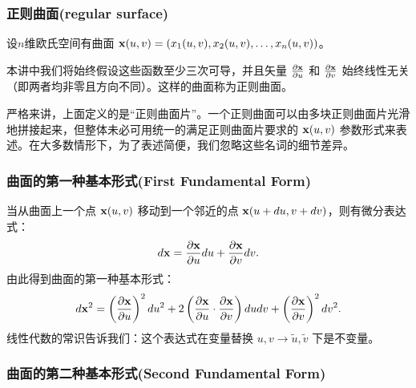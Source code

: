 \documentclass[CJK,13pt]{beamer}
\date{}
\begin{document}
  \bch
{}


\begin{frame}
  \frametitle{正则曲面(regular surface)}
  设$n$维欧氏空间有曲面 ${\mathbf{x}}(u, v) = \left(x_1(u, v), x_2(u, v), \ldots, x_n(u, v)\right)$。

  \skipline
  
  本讲中我们将始终假设这些函数至少三次可导，并且矢量 $\frac{\partial{\mathbf{x}}}{\partial u}$ 和 $\frac{\partial{\mathbf{x}}}{\partial v}$ 始终线性无关（即两者均非零且方向不同）。这样的曲面称为正则曲面。

  \skiplines

  {\scriptsize 严格来讲，上面定义的是“正则曲面片”。一个正则曲面可以由多块正则曲面片光滑地拼接起来，但整体未必可用统一的满足正则曲面片要求的 ${\mathbf{x}}(u,v)$ 参数形式来表述。在大多数情形下，为了表述简便，我们忽略这些名词的细节差异。}
\end{frame}

\begin{frame}
  \frametitle{曲面的第一种基本形式(First Fundamental Form)}
  当从曲面上一个点 ${\mathbf{x}}(u,v)$ 移动到一个邻近的点 ${\mathbf{x}}(u+du, v+dv)$，则有微分表达式：
  $$ d{\mathbf{x}} = \frac{\partial{\mathbf{x}}}{\partial u} du + \frac{\partial{\mathbf{x}}}{\partial v} dv. $$
  由此得到曲面的第一种基本形式：
  $$d{\mathbf{x}}^2 = \left(\frac{\partial{\mathbf{x}}}{\partial u}\right)^2 du^2 +2\left(\frac{\partial{\mathbf{x}}}{\partial u}\cdot\frac{\partial{\mathbf{x}}}{\partial v}\right)du dv+ \left(\frac{\partial{\mathbf{x}}}{\partial v}\right)^2 dv^2.$$
  线性代数的常识告诉我们：这个表达式在变量替换 $u,v\rightarrow \tilde{u}, \tilde{v}$ 下是不变量。
\end{frame}






\begin{frame}
  \frametitle{曲面的第二种基本形式(Second Fundamental Form)}
  
\end{frame}


\ech
\end{document}

